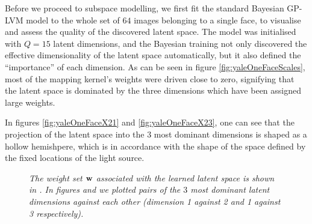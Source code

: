 Before we proceed to subspace modelling, we first fit the standard Bayesian GP-LVM model to the whole set of $64$ images belonging to a single face, to visualise and assess the quality of the discovered latent space.
The model was initialised with $Q=15$ latent dimensions, and the Bayesian training not only discovered the effective dimensionality of the latent space automatically,
but it also defined the ``importance'' of each dimension. As can be seen in figure \ref{fig:yaleOneFaceScales}, most of the mapping kernel's weights were driven close to zero, signifying that the 
latent space is dominated by the three dimensions which have been assigned large weights.

In figures
\ref{fig:yaleOneFaceX21} and \ref{fig:yaleOneFaceX23}, one can see that the projection of the latent space into the 3 most dominant dimensions is shaped as a hollow 
hemishpere, which is in accordance with the shape of the space defined by the fixed locations of the light source.

\hspace{-6pt}
\begin{figure}[ht]
\begin{center}
\hspace{-5pt}
\hspace{-5pt}
\end{center}
\vspace{-7pt}
\caption{\small{ \it
The weight set $\mathbf{w}$ associated with the learned latent space is shown in .
In figures  and  we plotted pairs of the $3$ most dominant
latent dimensions against each other (dimension 1 against 2 and 1 against 3 respectively).
}
}
\label{fig:yaleOneFace1}
\vspace{-8pt}
\end{figure}
\hspace{-6pt}


